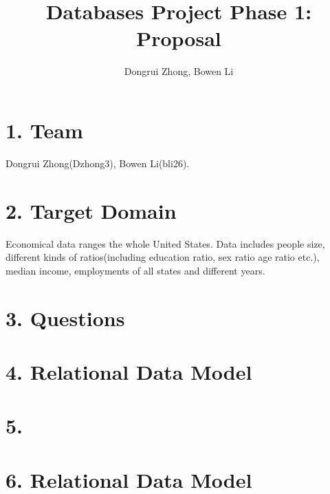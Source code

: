 \documentclass{article}
\author{Dongrui Zhong, Bowen Li}
\title{Databases Project Phase 1: Proposal}
\begin{document}
\maketitle
\section*{1. Team}
Dongrui Zhong(Dzhong3), Bowen Li(bli26).

\section*{2. Target Domain}
Economical data ranges the whole United States. Data includes people size, different kinds of ratios(including education ratio, sex ratio age ratio etc.), median income, employments of all states and different years.

\section*{3. Questions}

\section*{4. Relational Data Model}

\section*{5. }

\section*{6. Relational Data Model}
\end{document}
